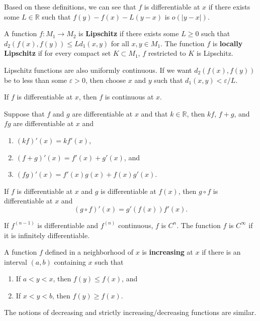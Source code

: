 \documentclass[10pt]{report}
\begin{document}
Based on these definitions, we can see that $f$ is differentiable at $x$ if there exists some $L \in \mathbb{R}$ such that $f(y)-f(x)-L(y-x)$ is $o(|y-x|)$.

\begin{defn}[]
	A function $f:M_1\to M_2$ is \textbf{Lipschitz} if there exists some $L \geq 0$ such that $d_2(f(x), f(y)) \leq L d_1(x,y)$ for all $x,y \in M_1$. The function $f$ is \textbf{locally Lipschitz} if for every compact set $K \subset M_1$, $f$ restricted to $K$ is Lipschitz.
\end{defn}

Lipschitz functions are also uniformly continuous. If we want $d_2(f(x),f(y))$ be to less than some $\varepsilon>0$, then choose $x$ and $y$ such that $d_1(x,y) < \varepsilon/L$.

\begin{prop}
	If $f$ is differentiable at $x$, then $f$ is continuous at $x$.
\end{prop}

\begin{thrm}{}{}
Suppose that $f$ and $g$ are differentiable at $x$ and that $k \in \mathbb{R}$, then $kf$, $f+g$, and $fg$ are differentiable at $x$ and
\begin{enumerate}
	\item $(kf)'(x) = kf'(x)$,
	\item $(f+g)'(x) = f'(x) + g'(x)$, and
	\item $(fg)'(x) = f'(x) g(x) + f(x) g'(x)$.
\end{enumerate}
\end{thrm}

\begin{thrm}
	If $f$ is differentiable at $x$ and $g$ is differentiable at $f(x)$, then $g \circ f$ is differentiable at $x$ and
	\[
		(g \circ f)'(x) = g'(f(x)) f'(x).
	\] 
\end{thrm}

\begin{defn}[]
If $f^{(n-1)}$ is differentiable and $f^{(n)}$ continuous, $f$ is $C^{n}$. The function $f$ is $C^{\infty}$ if it is infinitely differentiable. 
\end{defn}

\begin{defn}[]
	A function $f$ defined in a neighborhood of $x$ is \textbf{increasing} at $x$ if there is an interval $(a,b)$ containing $x$ such that
	\begin{enumerate}
		\item If $a < y < x$, then $f(y) \leq f(x)$, and
		\item If $x < y < b$, then $f(y) \geq f(x)$.
	\end{enumerate}
	The notions of decreasing and strictly increasing/decreasing functions are similar.
\end{defn}
\end{document}
